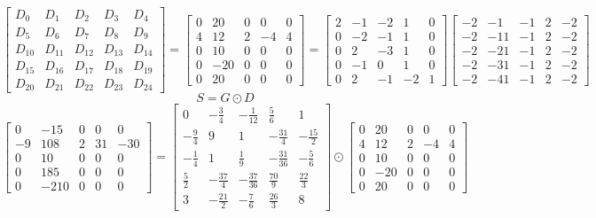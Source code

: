\documentclass{article}%
\begin{document}
\[%
\left[\begin{matrix}D_{0} & D_{1} & D_{2} & D_{3} & D_{4}\\D_{5} & D_{6} & D_{7} & D_{8} & D_{9}\\D_{10} & D_{11} & D_{12} & D_{13} & D_{14}\\D_{15} & D_{16} & D_{17} & D_{18} & D_{19}\\D_{20} & D_{21} & D_{22} & D_{23} & D_{24}\end{matrix}\right] = \left[\begin{matrix}0 & 20 & 0 & 0 & 0\\4 & 12 & 2 & -4 & 4\\0 & 10 & 0 & 0 & 0\\0 & -20 & 0 & 0 & 0\\0 & 20 & 0 & 0 & 0\end{matrix}\right] = \left[\begin{matrix}2 & -1 & -2 & 1 & 0\\0 & -2 & -1 & 1 & 0\\0 & 2 & -3 & 1 & 0\\0 & -1 & 0 & 1 & 0\\0 & 2 & -1 & -2 & 1\end{matrix}\right] \left[\begin{matrix}-2 & -1 & -1 & 2 & -2\\-2 & -11 & -1 & 2 & -2\\-2 & -21 & -1 & 2 & -2\\-2 & -31 & -1 & 2 & -2\\-2 & -41 & -1 & 2 & -2\end{matrix}\right]%
\]%
\[%
S = G \odot D%
\]%
\[%
\left[\begin{matrix}0 & -15 & 0 & 0 & 0\\-9 & 108 & 2 & 31 & -30\\0 & 10 & 0 & 0 & 0\\0 & 185 & 0 & 0 & 0\\0 & -210 & 0 & 0 & 0\end{matrix}\right] = \left[\begin{matrix}0 & - \frac{3}{4} & - \frac{1}{12} & \frac{5}{6} & 1\\- \frac{9}{4} & 9 & 1 & - \frac{31}{4} & - \frac{15}{2}\\- \frac{1}{4} & 1 & \frac{1}{9} & - \frac{31}{36} & - \frac{5}{6}\\\frac{5}{2} & - \frac{37}{4} & - \frac{37}{36} & \frac{70}{9} & \frac{22}{3}\\3 & - \frac{21}{2} & - \frac{7}{6} & \frac{26}{3} & 8\end{matrix}\right] \odot \left[\begin{matrix}0 & 20 & 0 & 0 & 0\\4 & 12 & 2 & -4 & 4\\0 & 10 & 0 & 0 & 0\\0 & -20 & 0 & 0 & 0\\0 & 20 & 0 & 0 & 0\end{matrix}\right]%
\]%
\end{document}
